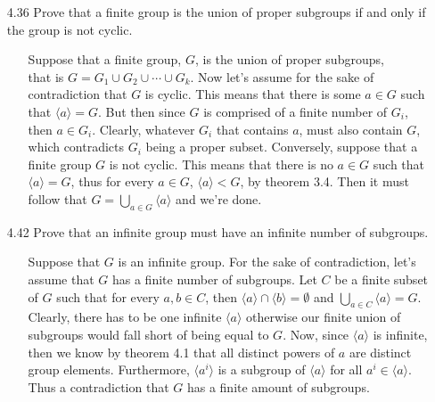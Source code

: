 \documentclass[12pt]{article}
\begin{document}
\begin{enumerate}
\item[4.36] Prove that a finite group is the union of proper subgroups if and only if
the group is not cyclic.
\begin{enumerate}
\item[] Suppose that a finite group, $G$, is the union of proper subgroups, \\
that is $G = G_1 \cup G_2 \cup \cdots \cup G_k$. Now let's assume for the sake of contradiction 
that $G$ is cyclic. This means that there is some $a \in G$ such that $\langle a\rangle = G$. 
But then since $G$ is comprised of a finite number of $G_i$, then $a \in G_i$. Clearly, whatever 
$G_i$ that contains $a$, must also contain $G$, which contradicts $G_i$ being a proper
subset. Conversely, suppose that a finite group $G$ is not cyclic. This means that there is no
$a \in G$ such that $\langle a\rangle = G$, thus for every $a \in G$, $\langle a\rangle 
< G$, by theorem 3.4. Then it must follow that $G = \bigcup_{a \in G}\langle a\rangle$
and we're done.
\end{enumerate}

\item[4.42] Prove that an infinite group must have an infinite number of subgroups.
\begin{enumerate}
\item[] Suppose that $G$ is an infinite group. For the sake of contradiction, let's assume 
that $G$ has a finite number of subgroups. Let $C$ be a finite subset of $G$ such that
for every $a, b \in C$, then $\langle a\rangle \cap \langle b\rangle
= \emptyset$ and $\bigcup_{a \in C}\langle a\rangle = G$. Clearly, there has to be
one infinite $\langle a\rangle$ otherwise our finite union of subgroups would
fall short of being equal to $G$. Now, since $\langle a\rangle$ is infinite, then we know
by theorem 4.1 that all distinct powers of $a$ are distinct group elements. Furthermore,
$\langle a^i\rangle$ is a subgroup of $\langle a\rangle$ for all $a^i \in \langle a\rangle$. 
Thus a contradiction that $G$ has a finite amount of subgroups.
\end{enumerate}


\end{enumerate}
\end{document}
